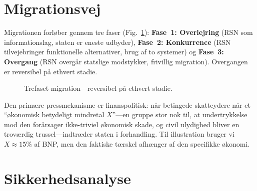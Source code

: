 \documentclass[11pt,a4paper,twocolumn]{article}
\begin{document}
\section{Migrationsvej}

Migrationen forløber gennem tre faser (Fig.~\ref{fig:migration}): \textbf{Fase~1: Overlejring} (RSN som informationslag, staten er eneste udbyder), \textbf{Fase~2: Konkurrence} (RSN tilvejebringer funktionelle alternativer, brug af to systemer) og \textbf{Fase~3: Overgang} (RSN overgår statslige modstykker, frivillig migration). Overgangen er reversibel på ethvert stadie.

\begin{figure}[ht]
\centering
{}
\caption{Trefaset migration---reversibel på ethvert stadie.}
\label{fig:migration}
\end{figure}

Den primære pressmekanisme er finanspolitisk: når betingede skatteydere når et ``økonomisk betydeligt mindretal $X$''---en gruppe stor nok til, at undertrykkelse mod den forårsager ikke-triviel økonomisk skade, og civil ulydighed bliver en troværdig trussel---indtræder staten i forhandling. Til illustration bruger vi $X \approx 15\%$ af BNP, men den faktiske tærskel afhænger af den specifikke økonomi.

\section{Sikkerhedsanalyse}
\end{document}
